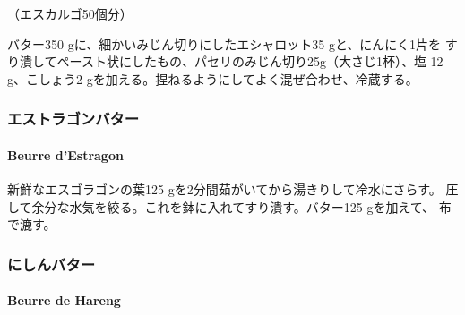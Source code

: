 \begin{recette}
（エスカルゴ50個分）

バター350 gに、細かいみじん切りにしたエシャロット35 gと、にんにく1片を
すり潰してペースト状にしたもの、パセリのみじん切り25g（大さじ1杯）、塩
12 g、こしょう2 gを加える。捏ねるようにしてよく混ぜ合わせ、冷蔵する。

\maeaki

\hypertarget{ux30a8ux30b9ux30c8ux30e9ux30b4ux30f3ux30d0ux30bfux30fc}{%
\subsubsection{エストラゴンバター}\label{ux30a8ux30b9ux30c8ux30e9ux30b4ux30f3ux30d0ux30bfux30fc}}

\hypertarget{beurre-d-estragon}{%
\paragraph{Beurre d'Estragon}\label{beurre-d-estragon}}


新鮮なエスゴラゴンの葉125 gを2分間茹がいてから湯きりして冷水にさらす。
圧して余分な水気を絞る。これを鉢に入れてすり潰す。バター125 gを加えて、
布で漉す。

\maeaki

\hypertarget{ux306bux3057ux3093ux30d0ux30bfux30fc}{%
\subsubsection{にしんバター}\label{ux306bux3057ux3093ux30d0ux30bfux30fc}}

\hypertarget{beurre-de-hereng}{%
\paragraph{Beurre de Hareng}\label{beurre-de-hereng}}



\end{recette}
